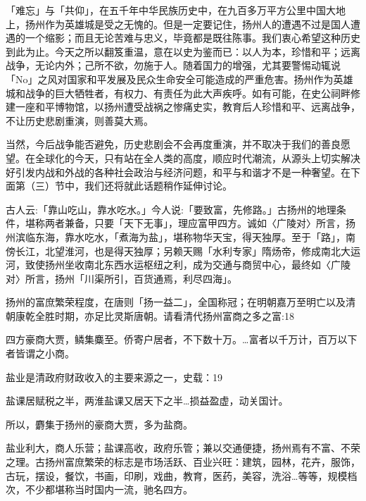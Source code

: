 「难忘」与「共仰」，在五千年中华民族历史中，在九百多万平方公里中国大地上，扬州作为英雄城是受之无愧的。但是一定要记住，扬州人的遭遇不过是国人遭遇的一个缩影；而且无论苦难与忠义，毕竟都是既往陈事。我们衷心希望这种历史到此为止。今天之所以翻笈重温，意在以史为鉴而已：以人为本，珍惜和平；远离战争，无论内外；己所不欲，勿施于人。随着国力的增强，尤其要警惕动辄说「No」之风对国家和平发展及民众生命安全可能造成的严重危害。扬州作为英雄城和战争的巨大牺牲者，有权力、有责任为此大声疾呼。如有可能，在史公祠畔修建一座和平博物馆，以扬州遭受战祸之惨痛史实，教育后人珍惜和平、远离战争，不让历史悲剧重演，则善莫大焉。

当然，今后战争能否避免，历史悲剧会不会再度重演，并不取决于我们的善良愿望。在全球化的今天，只有站在全人类的高度，顺应时代潮流，从源头上切实解决好引发内战和外战的各种社会政治与经济问题，和平与和谐才不是一种奢望。在下面第（三）节中，我们还将就此话题稍作延伸讨论。

\vfill
\begin{BookNotes}
\end{BookNotes}


古人云:「靠山吃山，靠水吃水。」今人说:「要致富，先修路。」古扬州的地理条件，堪称两者兼备，只要「天下无事」，理应富甲四方。诚如〈广陵对〉所言，扬州滨临东海，靠水吃水，「煮海为盐」，堪称物华天宝，得天独厚。至于「路」，南傍长江，北望淮河，也是得天独厚；另赖天赐「水利专家」隋炀帝，修成南北大运河，致使扬州坐收南北东西水运枢纽之利，成为交通与商贸中心，最终如〈广陵对〉所言，扬州「川渠所引，百货通焉，利尽四海」。

扬州的富庶繁荣程度，在唐则「扬一益二」，全国称冠；在明朝嘉万至明亡以及清朝康乾全胜时期，亦足比灵斯唐朝。请看清代扬州富商之多之富:18

\begin{BookQuote}
四方豪商大贾，鳞集麋至。侨寄户居者，不下数十万。…富者以千万计，百万以下者皆谓之小商。
\end{BookQuote}

盐业是清政府财政收入的主要来源之一，史载：19

\begin{BookQuote}
盐课居赋税之半，两淮盐课又居天下之半…损益盈虚，动关国计。
\end{BookQuote}

所以，麝集于扬州的豪商大贾，多为盐商。

盐业利大，商人乐营；盐课高收，政府乐管；兼以交通便捷，扬州焉有不富、不荣之理。古扬州富庶繁荣的标志是市场活跃、百业兴旺：建筑，园林，花卉，服饰，古玩，摆设，餐饮，书画，印刷，戏曲，教育，医药，美容，洗浴…等等，规模档次，不少都堪称当时国内一流，驰名四方。

